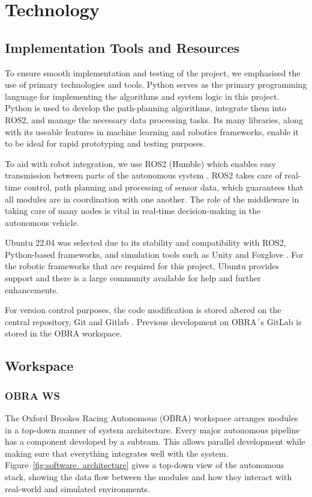 \documentclass[a4paper,11pt]{report}
\begin{document}
\chapter{Technology}
\section{Implementation Tools and Resources}

To ensure smooth implementation and testing of the project, we emphasised the use of primary technologies and tools. 
Python serves as the primary programming language for implementing the algorithms and system logic in this project. 
Python is used to develop the path-planning algorithms, integrate them into ROS2,
and manage the necessary data processing tasks. Its many libraries, along with its useable features in machine learning 
and robotics frameworks, enable it to be ideal for rapid prototyping and testing purposes.

To aid with robot integration, we use ROS2 (Humble) which enables easy transmission between parts of the 
autonomous system \cite{reference15}. ROS2 takes care of real-time control, path planning and processing of sensor data, which 
guarantees that all modules are in coordination with one another. The role of the middleware in taking care of 
many nodes is vital in real-time decision-making in the autonomous vehicle.

Ubuntu 22.04 was selected due to its stability and compatibility with ROS2, Python-based frameworks, 
and simulation tools such as Unity and Foxglove \cite{reference15, reference17}. For the robotic frameworks that are required for this project, 
Ubuntu provides support and there is a large community available for help and further enhancements.

For version control purposes, the code modification is stored altered on the central repository, 
Git and Gitlab \cite{reference24}. Previous development on OBRA´s GitLab is stored in the OBRA workspace.

\section{Workspace}
\subsection{OBRA WS}
The Oxford Brookes Racing Autonomous (OBRA) workspace arranges modules in a top-down manner of
system architecture. Every major autonomous pipeline has a component developed by a subteam.
This allows parallel development while making sure that everything integrates well with the system.
Figure~\ref{fig:software_architecture} gives a top-down view of the autonomous stack,
showing the data flow between the modules and how they interact with real-world and
simulated environments.
\end{document}
